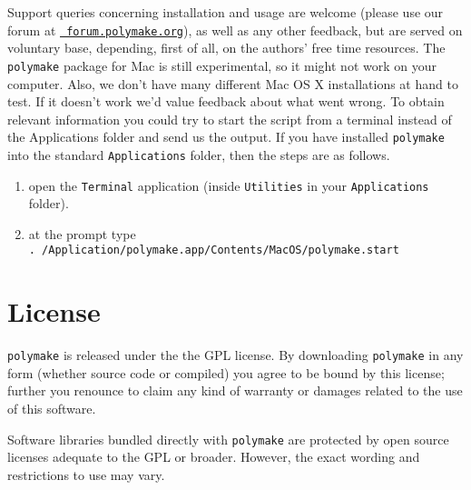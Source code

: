 \documentclass[a4paper]{amsart}
\newcommand{\polymake}{\texttt{polymake}\xspace}
\begin{document}
Support queries concerning installation and usage are welcome (please
use our forum at \href{http://forum.polymake.org}{\tt
  forum.polymake.org}), as well as any other feedback, but are served
on voluntary base, depending, first of all, on the authors' free time
resources.  The \polymake package for Mac is still experimental, so
it might not work on your computer. Also, we don't have many different
Mac OS X installations at hand to test. If it doesn't work we'd value
feedback about what went wrong. To obtain relevant information you
could try to start the script from a terminal instead of the
Applications folder and send us the output. If you have installed
\polymake into the standard \texttt{Applications} folder, then the
steps are as follows.
\begin{enumerate}
\item open the \texttt{Terminal} application (inside \texttt{Utilities} in your
  \texttt{Applications} folder).
\item at the prompt type\\
 \texttt{. /Application/polymake.app/Contents/MacOS/polymake.start}
\end{enumerate}


\section*{License}

\polymake is released under the the GPL license. By downloading
\polymake in any form (whether source code or compiled) you agree to
be bound by this license; further you renounce to claim
any kind of warranty or damages related to the use of this software.

Software libraries bundled directly with \polymake are protected by
open source licenses adequate to the GPL or broader. However, the
exact wording and restrictions to use may vary. 
\end{document}
